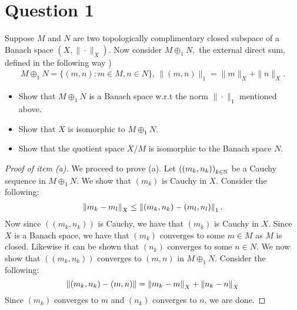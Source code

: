 \section{Question 1}
\horz
Suppose $M$ and $N$ are two topologically complimentary closed subspace of a Banach space $(X,\|\cdot\|_X).$  Now consider  $M\oplus_1 N,$ the external direct sum, defined in the following way )
\begin{align*}
M\oplus_1 N = \{(m,n): m\in M,n\in N\},\,\|(m,n)\|_1= \|m\|_X+\|n\|_X.
\end{align*}
\begin{itemize}
\item[(a)] Show that $M\oplus_1 N$ is a Banach space w.r.t the norm $\|\cdot\|_1$ mentioned above.
\item[(b)] Show that $X$ is isomorphic to $M\oplus_1 N.$ 
\item[(c)] Show that the quotient space $X/M$ is isomorphic to the Banach space $N.$
\end{itemize}

\horz
\begin{proof}[Proof of item (a)]
    We proceed to prove (a). Let $\left( \left( m_{k}, n_{k} \right) \right)_{k\in \mathbb N}$ be a Cauchy sequence in $M \oplus _{1} N$. We show that $\left( m_{k} \right)$ is Cauchy in $X$. Consider the following:
    \begin{align*}
	\left\lVert m_k - m_l \right\rVert_{X} \le \left\lVert \left( m_{k}, n_{k} \right) - \left( m_{l}, n_{l} \right) \right\rVert_{1}.
    \end{align*}
    Now since $\left( \left( m_{k}, n_{k} \right) \right)$ is Cauchy, we have that $\left( m_{k} \right)$ is Cauchy in $X$. Since $X$ is a Banach space, we have that $\left( m_{k} \right)$ converges to some $m\in M$ as $M$ is closed. Likewise it can be shown that $\left( n_{k} \right)$ converges to some $n \in N$. We now show that $\left( \left( m_{k}, n_{k} \right) \right)$ converges to $\left( m,n \right)$ in $M\oplus _{1}  N$. Consider the following:
    \begin{equation*}
	\left\lVert \left( m_{k}, n_{k} \right) - \left( m,n \right) \right\rVert = \left\lVert m_{k} -m  \right\rVert_{X} + \left\lVert n_{k} - n \right\rVert_{X} 
    \end{equation*}
    Since $\left( m_{k} \right)$ converges to $m$ and $\left( n_{k} \right)$ converges to $n$, we are done.
\end{proof}

